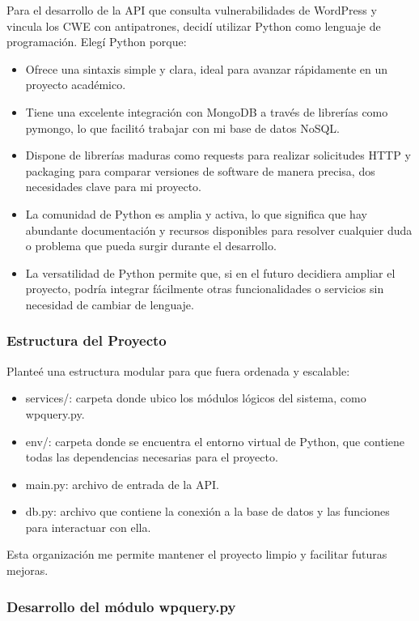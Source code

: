Para el desarrollo de la API que consulta vulnerabilidades de WordPress y vincula los CWE con antipatrones, decidí utilizar Python como lenguaje de programación.
Elegí Python porque:
\begin{itemize}
    \item Ofrece una sintaxis simple y clara, ideal para avanzar rápidamente en un proyecto académico.
    \item Tiene una excelente integración con MongoDB a través de librerías como pymongo, lo que facilitó trabajar con mi base de datos NoSQL.
    \item Dispone de librerías maduras como requests para realizar solicitudes HTTP y packaging para comparar versiones de software de manera precisa, dos necesidades clave para mi proyecto.
    \item La comunidad de Python es amplia y activa, lo que significa que hay abundante documentación y recursos disponibles para resolver cualquier duda o problema que pueda surgir durante el desarrollo.
    \item La versatilidad de Python permite que, si en el futuro decidiera ampliar el proyecto, podría integrar fácilmente otras funcionalidades o servicios sin necesidad de cambiar de lenguaje.
\end{itemize}

\subsubsection{Estructura del Proyecto}

Planteé una estructura modular para que fuera ordenada y escalable:
\begin{itemize}
    \item services/: carpeta donde ubico los módulos lógicos del sistema, como wpquery.py.
    \item env/: carpeta donde se encuentra el entorno virtual de Python, que contiene todas las dependencias necesarias para el proyecto.
    \item main.py: archivo de entrada de la API.
    \item db.py: archivo que contiene la conexión a la base de datos y las funciones para interactuar con ella.
\end{itemize}

Esta organización me permite mantener el proyecto limpio y facilitar futuras mejoras.

\subsubsection{Desarrollo del módulo wpquery.py}

